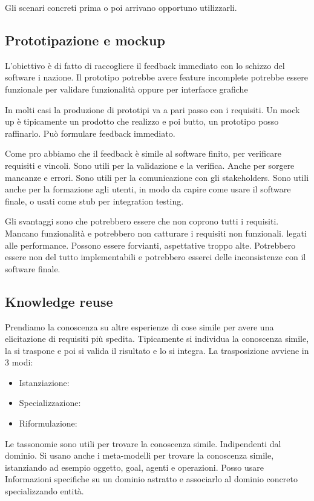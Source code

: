\documentclass[oneside,a4paper,11pt]{book}
\theoremstyle{italicstyle}
\theoremstyle{normStyle}
\begin{document}
Gli scenari concreti prima o poi arrivano opportuno utilizzarli.

\subsection{Prototipazione e mockup}
L'obiettivo è di fatto di raccogliere il feedback immediato con lo schizzo 
del software i nazione. Il prototipo potrebbe avere feature incomplete 
potrebbe essere funzionale per validare funzionalità oppure per interfacce grafiche 

In molti casi la produzione di prototipi va a pari passo con i requisiti.
Un mock up è tipicamente un prodotto che realizzo e poi butto, un 
prototipo posso raffinarlo.
Può formulare feedback immediato.

Come pro abbiamo che il feedback è simile al software finito, per verificare 
requisiti e vincoli. Sono utili per la validazione e la verifica. Anche per 
sorgere mancanze e errori. Sono utili per la comunicazione con gli stakeholders.
Sono utili anche per la formazione agli utenti, in modo da capire come
usare il software finale, o usati come stub per integration testing.

Gli svantaggi sono che potrebbero essere che non coprono tutti i requisiti.
Mancano funzionalità e potrebbero non catturare i requisiti non funzionali.
legati alle performance. Possono essere forvianti, aspettative troppo alte.
Potrebbero essere  non del tutto implementabili e potrebbero esserci delle 
inconsistenze con il software finale.

\subsection{Knowledge reuse}
Prendiamo la conoscenza su altre esperienze di cose simile per avere 
una elicitazione di requisiti più spedita.
Tipicamente si individua la conoscenza simile, la si traspone e poi 
si valida il risultato e lo si integra.
La trasposizione avviene in 3 modi:
\begin{itemize}
  \item Istanziazione: 
  \item Specializzazione:
  \item Riformulazione:
\end{itemize}
Le tassonomie sono utili per trovare la conoscenza simile. Indipendenti dal 
dominio.
Si usano anche i meta-modelli per trovare la conoscenza simile, istanziando ad 
esempio oggetto, goal, agenti e operazioni. Posso usare Informazioni specifiche 
su un dominio astratto e associarlo al dominio concreto specializzando entità.
\end{document}
